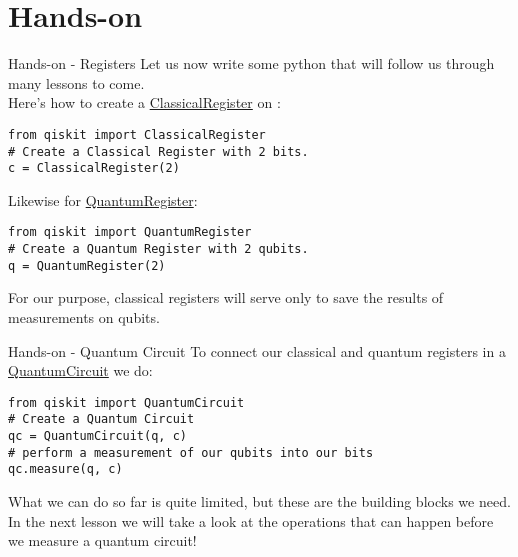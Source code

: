 \documentclass[aspectratio=43]{beamer}
\begin{document}
\section{Hands-on}
\begin{frame}[fragile]{Hands-on - Registers}
Let us now write some python that will follow us through many lessons to come.\\
Here's how to create a \href{https://qiskit.org/documentation/_autodoc/qiskit._classicalregister.html?highlight=classicalregister#module-qiskit._classicalregister}{ClassicalRegister} on \qk:
\begin{cardTiny}
\begin{verbatim}
from qiskit import ClassicalRegister
# Create a Classical Register with 2 bits.
c = ClassicalRegister(2)
\end{verbatim}
\end{cardTiny}
Likewise for \href{https://qiskit.org/documentation/_autodoc/qiskit._quantumregister.html?highlight=quantumregister#module-qiskit._quantumregister}{QuantumRegister}:
\begin{cardTiny}
\begin{verbatim}
from qiskit import QuantumRegister
# Create a Quantum Register with 2 qubits.
q = QuantumRegister(2)
\end{verbatim}
\end{cardTiny}
For our purpose, classical registers will serve only to save the results of measurements on qubits.
\end{frame}

\begin{frame}[fragile]{Hands-on - Quantum Circuit}
To connect our classical and quantum registers in a \href{https://qiskit.org/documentation/_autodoc/qiskit._quantumcircuit.html#qiskit._quantumcircuit.QuantumCircuit}{QuantumCircuit} we do:
\begin{cardTiny}
\begin{verbatim}
from qiskit import QuantumCircuit
# Create a Quantum Circuit
qc = QuantumCircuit(q, c)
# perform a measurement of our qubits into our bits
qc.measure(q, c)
\end{verbatim}
\end{cardTiny}
What we can do so far is quite limited, but these are the building blocks we need. In the next lesson we will take a look at the operations that can happen before we measure a quantum circuit!
\end{frame}
\end{document}
